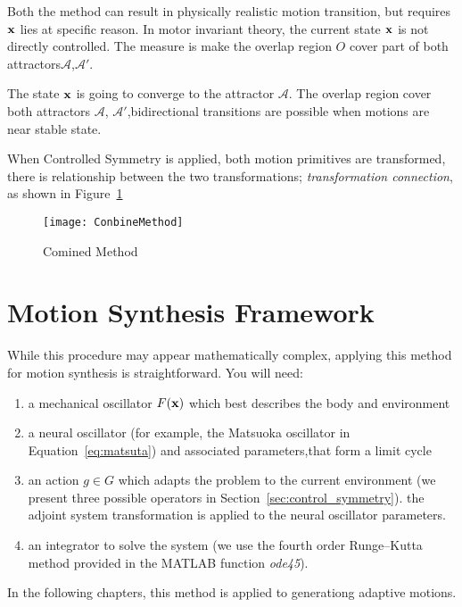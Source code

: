 Both the method can result in physically realistic motion transition, but requires $\mathbf{x}$ lies at specific reason.
In motor invariant theory, the current state $\mathbf{x}$ is not directly controlled.
The measure is make the overlap region $O$ cover part of both attractors$\mathcal{A}$,$\mathcal{A'}$.

The state $\mathbf{x}$ is going to converge to the attractor $\mathcal{A}$.
The overlap region cover both attractors $\mathcal{A}$, $\mathcal{A'}$,bidirectional transitions are possible when motions are near stable state.

When Controlled Symmetry is applied, both motion primitives are transformed, there is relationship between the two transformations; \emph{transformation connection}, as shown in Figure~\ref{fig:Combine}

\begin{figure}[!htbp]
  \begin{center}
      \texttt{[image: ConbineMethod]}
    \caption{Comined Method}
    \label{fig:Combine}
  \end{center}
\end{figure}

\section{Motion Synthesis Framework}
While this procedure may appear mathematically complex, applying this method for motion synthesis is straightforward. 
You will need:
\begin{enumerate}
\item a mechanical oscillator $F(\mathbf{x})$ which best describes the body and environment
\item a neural oscillator (for example, the Matsuoka oscillator in Equation~\ref{eq:matsuta}) and associated parameters,that form a limit cycle

\item an action $g \in G$ which adapts the problem to the current environment (we present three possible operators in Section~\ref{sec:control_symmetry}). the adjoint system transformation  is applied to the neural oscillator parameters.

\item an integrator to solve the system (we use the fourth order Runge--Kutta method provided in the {MATLAB} function \emph{ode45}).
\end{enumerate}
In the following chapters, this method is applied to generationg adaptive motions.



